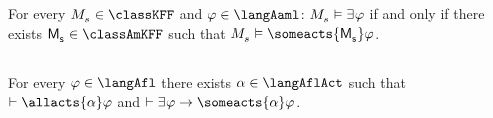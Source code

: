 \begin{corollary}
    For every $\kPModel{\kStateS} \in \classKFF$ and $\phi \in \langAaml$: $\kPModel{\kStateS} \entails \somerefs \phi$ if and only if there exists $\aPModel{\aStateS} \in \classAmKFF$ such that $\kPModel{\kStateS} \entails \someacts{\aPModel{\aStateS}} \phi$.
\end{corollary}

\subsection{\classS{}}

\begin{proposition}\label{afl-s-synthesis}
    For every $\phi \in \langAfl$ there exists $\alpha \in \langAflAct$ such that $\proves \allacts{\alpha} \phi$ and $\proves \somerefs \phi \implies \someacts{\alpha} \phi$.
\end{proposition}

